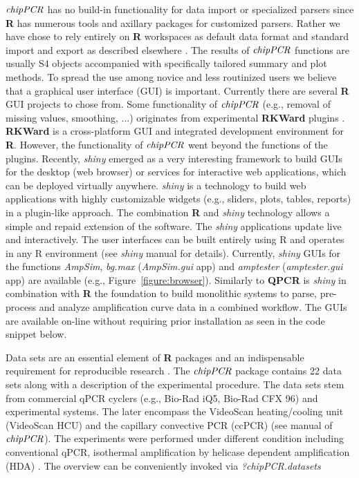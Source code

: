 \documentclass[twocolumn]{bmcart}%
\begin{document}
 $\emph{chipPCR}$ has no build-in functionality for data import or specialized 
parsers since \textbf{R} has numerous tools and axillary packages for customized 
parsers. Rather we have chose to rely entirely on \textbf{R} workspaces as 
default data format and standard import and export as described elsewhere 
\cite{RDCT2010c}. The results of $\emph{chipPCR}$ functions are usually S4 objects 
accompanied with specifically tailored summary and plot methods. To spread 
the use among novice and less routinized users we believe that a graphical user 
interface (GUI) is important. Currently there are several \textbf{R} GUI 
projects \cite{Valero_2012} to chose from. Some functionality of 
$\emph{chipPCR}$ (e.g., removal of missing values, smoothing, ...) originates 
from experimental \textbf{RKWard} plugins \cite{roediger_bead_qPCR_2013, 
roediger_RKWard_2013}. \textbf{RKWard} \cite{rodiger_rkward_2012} is a 
cross-platform GUI and integrated development environment for \textbf{R}. 
However, the functionality of $\emph{chipPCR}$ went beyond the functions of the 
plugins. Recently, \emph{shiny} emerged as a very interesting framework to build 
GUIs for the desktop (web browser) or services for interactive web applications, 
which can be deployed virtually anywhere. \emph{shiny} is a technology to build 
web applications with highly customizable widgets (e.g., sliders, plots, tables, 
reports) in a plugin-like approach. The combination \textbf{R} and \emph{shiny} 
technology allows a simple and repaid extension of the software. The 
\emph{shiny} applications update live and interactively. The user interfaces can 
be built entirely using R and operates in any R environment (see \emph{shiny} 
manual for details). Currently, \emph{shiny} GUIs for the functions 
\textsl{AmpSim}, \textsl{bg.max} (\textsl{AmpSim.gui} app) and 
\textsl{amptester} (\textsl{amptester.gui} app) are available (e.g., 
Figure~\ref{figure:browser}). Similarly to \textbf{QPCR} \cite{pabinger_2009} is 
\emph{shiny} in combination with \textbf{R} the foundation to build monolithic 
systems to parse, pre-process and analyze amplification curve data in a combined 
workflow. The GUIs are available on-line without requiring prior installation as 
seen in the code snippet below.

Data sets are an essential element of \textbf{R} packages \cite{hofmann_2013} 
and an indispensable requirement for reproducible research \cite{Leeper_2014}. 
The $\emph{chipPCR}$ package contains 22 data sets along with a description of 
the experimental procedure. The data sets stem from commercial qPCR cyclers 
(e.g., Bio-Rad iQ5, Bio-Rad CFX 96) and experimental systems. The later 
encompass the VideoScan heating/cooling unit (VideoScan HCU) 
\cite{roediger_highly_2013} and the capillary convective PCR (ccPCR) (see 
manual 
of $\emph{chipPCR}$). The experiments were performed under different condition 
including conventional qPCR, isothermal amplification by helicase dependent 
amplification (HDA) \cite{rodiger_nucleic_2014}. The overview can be 
conveniently invoked via \textsl{?chipPCR.datasets}
\end{document}
